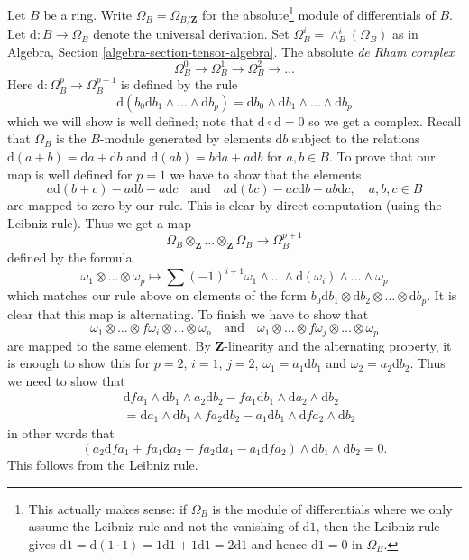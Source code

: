 \begin{remark}
\label{remark-absolute-de-rham-complex}
Let $B$ be a ring. Write $\Omega_B = \Omega_{B/\mathbf{Z}}$
for the absolute\footnote{This
actually makes sense: if $\Omega_B$ is the module of differentials
where we only assume the Leibniz rule and not the vanishing of $\text{d}1$,
then the Leibniz rule gives $\text{d}1 = \text{d}(1 \cdot 1) =
1 \text{d}1 + 1 \text{d}1 = 2 \text{d}1$ and hence
$\text{d}1 = 0$ in $\Omega_B$.} module of differentials of $B$.
Let $\text{d} : B \to \Omega_B$ denote the universal derivation. Set
$\Omega_B^i = \wedge^i_B(\Omega_B)$ as in
Algebra, Section \ref{algebra-section-tensor-algebra}.
The absolute {\it de Rham complex}
$$
\Omega_B^0 \to \Omega_B^1 \to \Omega_B^2 \to \ldots
$$
Here $\text{d} : \Omega_B^p \to \Omega_B^{p + 1}$
is defined by the rule
$$
\text{d}\left(b_0\text{d}b_1 \wedge \ldots \wedge \text{d}b_p\right) =
\text{d}b_0 \wedge \text{d}b_1 \wedge \ldots \wedge \text{d}b_p
$$
which we will show is well defined; note that
$\text{d} \circ \text{d} = 0$ so we get a complex.
Recall that $\Omega_B$ is the $B$-module generated by
elements $\text{d}b$ subject to the relations
$\text{d}(a + b) = \text{d}a + \text{d}b$ and
$\text{d}(ab) = b\text{d}a + a\text{d}b$
for $a, b \in B$. To prove that our map is well defined for $p = 1$
we have to show that the elements
$$
a\text{d}(b + c) - a\text{d}b - a\text{d}c
\quad\text{and}\quad
a\text{d}(bc) - ac\text{d}b - ab\text{d}c,\quad a,b,c \in B
$$
are mapped to zero by our rule. This is clear by direct computation
(using the Leibniz rule). Thus we get a map
$$
\Omega_B \otimes_\mathbf{Z} \ldots \otimes_\mathbf{Z} \Omega_B
\longrightarrow
\Omega_B^{p + 1}
$$
defined by the formula
$$
\omega_1 \otimes \ldots \otimes \omega_p
\longmapsto
\sum (-1)^{i + 1}
\omega_1 \wedge \ldots \wedge \text{d}(\omega_i) \wedge \ldots \wedge \omega_p
$$
which matches our rule above on elements of the form
$b_0\text{d}b_1 \otimes \text{d}b_2 \otimes \ldots \otimes \text{d}b_p$.
It is clear that this map is alternating. To finish we have to show
that
$$
\omega_1 \otimes \ldots \otimes f\omega_i \otimes \ldots \otimes \omega_p
\quad\text{and}\quad
\omega_1 \otimes \ldots \otimes f\omega_j \otimes \ldots \otimes \omega_p
$$
are mapped to the same element. By $\mathbf{Z}$-linearity and
the alternating property, it is enough to show this for $p = 2$, $i = 1$,
$j = 2$, $\omega_1 = a_1 \text{d}b_1$ and $\omega_2 = a_2 \text{d}b_2$.
Thus we need to show that
\begin{align*}
& \text{d}fa_1 \wedge \text{d}b_1 \wedge a_2\text{d}b_2
- fa_1 \text{d}b_1 \wedge \text{d}a_2 \wedge \text{d}b_2 \\
& =
\text{d}a_1 \wedge \text{d}b_1 \wedge fa_2\text{d}b_2
- a_1 \text{d}b_1 \wedge \text{d}fa_2 \wedge \text{d}b_2
\end{align*}
in other words that
$$
(a_2 \text{d}fa_1 + fa_1 \text{d}a_2 - fa_2 \text{d}a_1 - a_1 \text{d}fa_2)
\wedge \text{d}b_1 \wedge \text{d}b_2 = 0.
$$
This follows from the Leibniz rule.
\end{remark}


